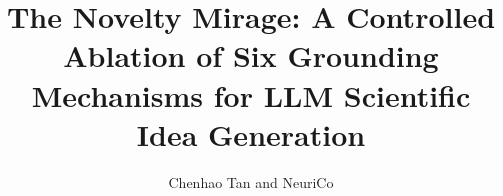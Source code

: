 \documentclass{article}
\title{The Novelty Mirage: A Controlled Ablation of Six Grounding\\ Mechanisms for LLM Scientific Idea Generation}
\author{Chenhao Tan and NeuriCo}
\begin{document}
\maketitle

\begin{abstract}

\end{abstract}









\end{document}

